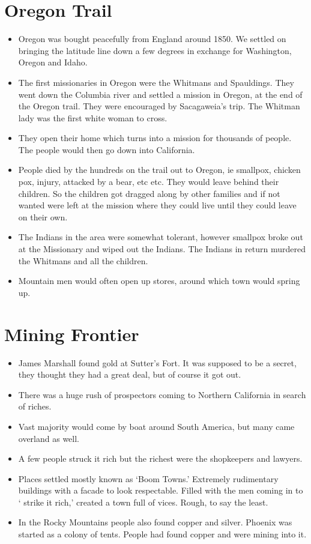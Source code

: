 \documentclass{article}
\begin{document}
\section{Oregon Trail}
  \begin{itemize}
    \item Oregon was bought peacefully from England around 1850. We settled on bringing the latitude line down a few degrees in exchange for Washington, Oregon and Idaho. 
    \item The first missionaries in Oregon were the Whitmans and Spauldings. They went down the Columbia river and settled a mission in Oregon, at the end of the Oregon trail. They were encouraged by Sacagaweia's trip. The Whitman lady was the first white woman to cross.
    \item They open their home which turns into a mission for thousands of people. The people would then go down into California.
    \item People died by the hundreds on the trail out to Oregon, ie smallpox, chicken pox, injury, attacked by a bear, etc etc. They would leave behind their children. So the children got dragged along by other families and if not wanted were left at the mission where they could live until they could leave on their own.
    \item The Indians in the area were somewhat tolerant, however smallpox broke out at the Missionary and wiped out the Indians. The Indians in return murdered the Whitmans and all the children.
    \item Mountain men would often open up stores, around which town would spring up.
  \end{itemize}
\section{Mining Frontier}
  \begin{itemize}
    \item James Marshall found gold at Sutter's Fort. It was supposed to be a secret, they thought they had a great deal, but of course it got out.
    \item There was a huge rush of prospectors coming to Northern California in search of riches.
    \item Vast majority would come by boat around South America, but many came overland as well.
    \item A few people struck it rich but the richest were the shopkeepers and lawyers.
    \item Places settled mostly known as `Boom Towns.' Extremely rudimentary buildings with a facade to look respectable. Filled with the men coming in to ` strike it rich,' created a town full of vices. Rough, to say the least.
    \item In the Rocky Mountains people also found copper and silver. Phoenix was started as a colony of tents. People had found copper and were mining into it. 
  \end{itemize}
\end{document}

